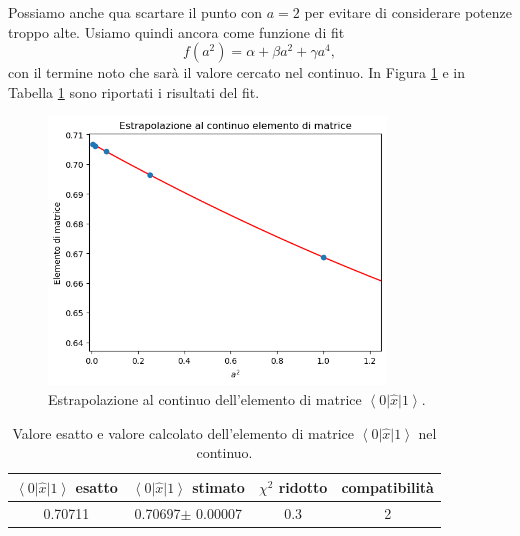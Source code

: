 \documentclass{article}
\begin{document}
Possiamo anche qua scartare il punto con $a=2$ per evitare di considerare potenze troppo alte. Usiamo quindi ancora come funzione di fit
\begin{equation}
    f(a^2)=\alpha+\beta a^2+\gamma a^4,
\end{equation}
con il termine noto che sarà il valore cercato nel continuo. In Figura \ref{grafico estrapolazione matrice} e in Tabella \ref{tabella energie matrice} sono riportati i risultati del fit.
\begin{figure}[h]
    \centering
    \includegraphics[width=0.8\textwidth]{images/matrix_el_estrapolazione.png}
    \caption{Estrapolazione al continuo dell'elemento di matrice $\left<0\right|\hat{x}\left|1\right>$.}
    \label{grafico estrapolazione matrice}
\end{figure}
\begin{table}[h]
    \centering
    \begin{tabular}{||c c c c||} 
     \hline
    $\left<0\right|\hat{x}\left|1\right>$ esatto & $\left<0\right|\hat{x}\left|1\right>$ stimato & $\chi^2$ ridotto & compatibilità\\[0.5ex] 
     \hline\hline
     0.70711 & 0.70697$\pm$ 0.00007 & 0.3 & 2\\[1ex] 
     \hline
    \end{tabular}
    \caption{Valore esatto e valore calcolato dell'elemento di matrice $\left<0\right|\hat{x}\left|1\right>$ nel continuo.}
    \label{tabella energie matrice}
\end{table}
\end{document}
